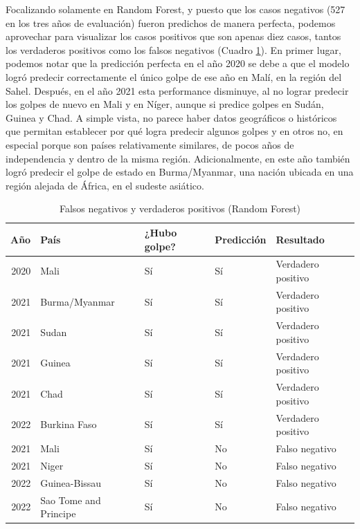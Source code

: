 \documentclass{article}
\begin{document}
Focalizando solamente en Random Forest, y puesto que los casos negativos (527 en los 
tres años de evaluación) fueron predichos de manera perfecta, podemos aprovechar para 
visualizar los casos positivos que son apenas diez casos, tantos los verdaderos 
positivos como los falsos negativos (Cuadro \ref{tab:resultados}). En primer lugar,
podemos notar que la predicción perfecta en el año 2020 se debe a que el modelo logró
predecir correctamente el único golpe de ese año en Malí, en la región del Sahel. Después, 
en el año 2021 esta performance disminuye, al no lograr predecir los golpes de nuevo en 
Mali y en Níger, aunque si predice golpes en Sudán, Guinea y Chad. A simple vista, no parece 
haber datos geográficos o históricos que permitan establecer por qué logra predecir algunos 
golpes y en otros no,
en especial porque son países relativamente similares, de pocos años de independencia y
dentro de la misma región. Adicionalmente, en este año también logró predecir el golpe de
estado en Burma/Myanmar, una nación ubicada en una región alejada de África, en el sudeste
asiático.

\begin{table}[H]
  \centering
    \begin{tabular}{rllll}
      \toprule
      Año & País & ¿Hubo golpe? & Predicción & Resultado \\
      \midrule
      2020 & Mali                  & Sí & Sí & Verdadero positivo \\
      2021 & Burma/Myanmar         & Sí & Sí & Verdadero positivo \\
      2021 & Sudan                 & Sí & Sí & Verdadero positivo \\
      2021 & Guinea                & Sí & Sí & Verdadero positivo \\
      2021 & Chad                  & Sí & Sí & Verdadero positivo \\
      2022 & Burkina Faso          & Sí & Sí & Verdadero positivo \\
      2021 & Mali                  & Sí & No & Falso negativo \\
      2021 & Niger                 & Sí & No & Falso negativo \\
      2022 & Guinea-Bissau         & Sí & No & Falso negativo \\
      2022 & Sao Tome and Principe & Sí & No & Falso negativo \\
      \bottomrule
    \end{tabular}
  \caption{Falsos negativos y verdaderos positivos (Random Forest) \label{tab:resultados}}
\end{table}
\end{document}
